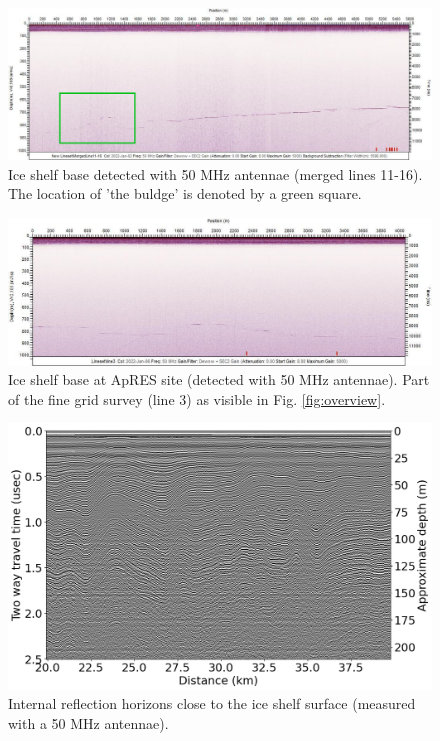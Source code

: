\documentclass[a4paper,12pt]{article}
\begin{document}
\begin{figure}[H]
\includegraphics[width=\textwidth]{Figures/PulseEkko/PE_bulge.png}
\caption{Ice shelf base detected with 50 MHz antennae (merged lines 11-16). The location of 'the buldge' is denoted by a green square.}
\label{fig_PE_bulge}
\end{figure}
\begin{figure}[H]
\includegraphics[width=\textwidth]{Figures/PulseEkko/Pulse_Ekko_FG1_line3.jpg}
\caption{Ice shelf base at ApRES site (detected with 50 MHz antennae). Part of the fine grid survey (line 3) as visible in Fig. \ref{fig:overview}.}
\label{fig_PE_ApRES_site}
\end{figure}
\begin{figure}[H]
\includegraphics[width=\linewidth]{Figures/PulseEkko/PE_layers_surface.png}
\caption{Internal reflection horizons close to the ice shelf surface (measured with a 50 MHz antennae).}
\label{fig_IRH1}
\end{figure}
\end{document}

